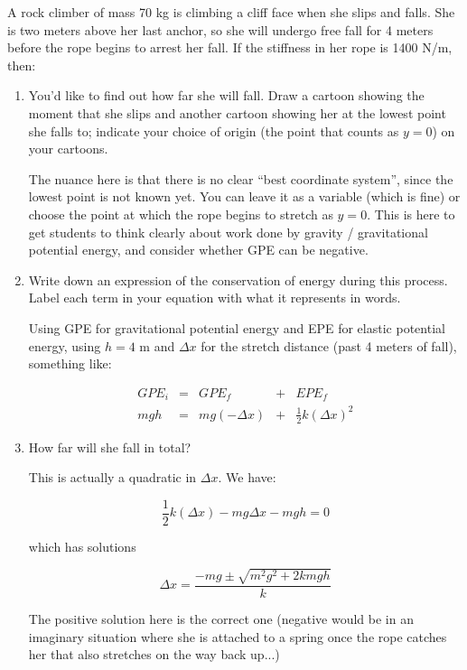 \documentclass[12pt]{article}
\begin{document}
\Large
\centerline{}
\normalsize
\centerline{}



{A rock climber of mass 70 kg is climbing a cliff face when she slips and falls. She is two meters above her last anchor, so she will undergo free fall for 4 meters before the rope begins to arrest her fall. If the stiffness in her rope is 1400 N/m, then:}
\begin{enumerate}
	\item You'd like to find out how far she will fall. Draw a cartoon showing the moment that she slips and another cartoon showing her at the lowest point she falls to; indicate your choice of origin (the point that counts as $y=0$) on your cartoons.
	
	{\color{red} The nuance here is that there is no clear ``best coordinate system'', since the lowest point is not known yet. You can leave it as a variable (which is fine) or choose the point at which the rope begins to stretch as $y=0$. This is here to get students to think clearly about work done by gravity / gravitational potential energy, and consider whether GPE can be negative.}
	

	\item Write down an expression of the conservation of energy during this process. Label each term in your equation with what it represents in words.
	
	{\color{red} Using GPE for gravitational potential energy and EPE for elastic potential energy, using $h = 4$ m and $\Delta x$ for the stretch distance (past 4 meters of fall), something like:
	
	\begin{minipage}{3in}
\begin{align*}
GPE_i &=& GPE_f &+& EPE_f \\
mgh &=& mg(-\Delta x) &+& \frac{1}{2}k (\Delta x)^2
\end{align*}
\end{minipage}
}
	
	\item{How far will she fall in total?}
	
{	\color{red}
	This is actually a quadratic in $\Delta x$. We have:
	
	$$\frac{1}{2}k (\Delta x) - mg\Delta x - mgh = 0$$
	
	which has solutions
	
	$$\Delta x = \frac{-mg \pm \sqrt{m^2g^2 + 2kmgh}}{k}$$
	
	The positive solution here is the correct one (negative would be in an imaginary situation where she is attached to a spring once the rope catches her that also stretches on the way back up...)
	
}
\end{enumerate}
\end{document}

